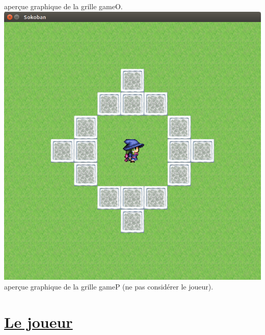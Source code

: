 \documentclass{article}
\begin{document}
	\newline
	aperçue graphique de la grille gameO.
	\newline
	\includegraphics[scale=0.25]{07.png}
	\newline
	aperçue graphique de la grille gameP (ne pas considérer le joueur).
\vspace{1cm}
\section{\underline{Le joueur}}
\end{document}
